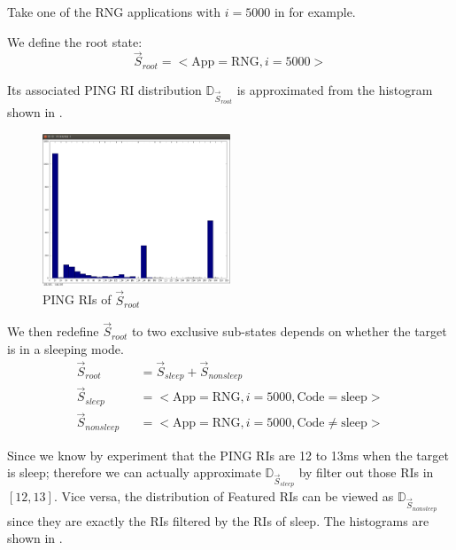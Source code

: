 \begin{example} \label{Ex: Black Box Example}
Take one of the RNG applications with $i = 5000$ in  for example. 

We define the root state:
\begin{equation*}
\vec{S}_{root} = <\text{App}=\text{RNG}, i=5000>
\end{equation*}

Its associated PING RI distribution $\mathbb{D}_{\vec{S}_{root}}$ is approximated from the histogram shown in .

\begin{figure}
\center
\includegraphics[width=0.5\textwidth]{fig/D_S.png}
\caption{PING RIs of $\vec{S}_{root}$}
\label{Fig: s_root}
\end{figure}

We then redefine $\vec{S}_{root}$ to two exclusive sub-states depends on whether the target is in a sleeping mode.
\begin{eqnarray*}
\vec{S}_{root} &&= \vec{S}_{sleep} + \vec{S}_{nonsleep} \\
\vec{S}_{sleep} &&= <\text{App} = \text{RNG}, i = 5000, \text{Code} = \text{sleep}> \\
\vec{S}_{nonsleep} &&= <\text{App} = \text{RNG}, i = 5000, \text{Code} \neq \text{sleep}>
\end{eqnarray*}

Since we know by experiment that the PING RIs are 12 to 13ms when the target is sleep; therefore we can actually approximate $\mathbb{D}_{\vec{S}_{sleep}}$ by filter out those RIs in $[12,13]$. Vice versa,  the distribution of Featured RIs can be viewed as $\mathbb{D}_{\vec{S}_{nonsleep}}$ since they are exactly the RIs filtered by the RIs of sleep. The histograms are shown in .


\end{example}
